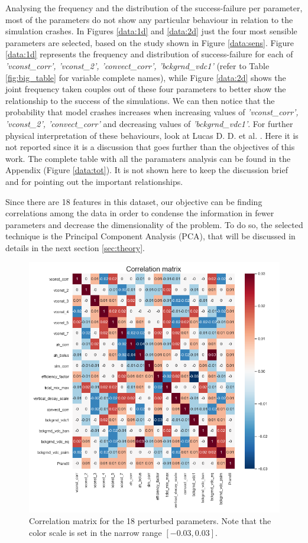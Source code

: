 \documentclass[english,notitlepage,reprint,nofootinbib]{revtex4-1}  %
\begin{document}
Analysing the frequency and the distribution of the success-failure per parameter, most of the parameters do not show any particular behaviour in relation to the simulation crashes. In Figures \ref{data:1d} and \ref{data:2d} just the four most sensible parameters are selected, based on the study \cite{failure} shown in Figure \ref{data:sens}. Figure \ref{data:1d} represents the frequency and distribution of success-failure for each of \textit{'vconst\_corr', 'vconst\_2', 'convect\_corr', 'bckgrnd\_vdc1'} (refer to Table \ref{fig:big_table} for variable complete names), while Figure \ref{data:2d} shows the joint frequency taken couples out of these four parameters to better show the relationship to the success of the simulations. We can then notice that the probability that model crashes increases when increasing values of \textit{'vconst\_corr', 'vconst\_2', 'convect\_corr'} and decreasing values of \textit{'bckgrnd\_vdc1'}. For further physical interpretation of these behaviours, look at Lucas D. D. et al. \cite{failure}. Here it is not reported since it is a discussion that goes further than the objectives of this work. The complete table with all the paramaters analysis can be found in the Appendix (Figure \ref{data:tot}). It is not shown here to keep the discussion brief and for pointing out the important relationships. 

Since there are 18 features in this dataset, our objective can be finding correlations among the data in order to condense the information in fewer parameters and decrease the dimensionality of the problem. To do so, the selected technique is the Principal Component Analysis (PCA), that will be discussed in details in the next section \ref{sec:theory}.

\begin{figure}[h]
    \centering 
    \includegraphics[scale=0.3]{dataset/correlationmatrix.png}
    \caption{Correlation matrix for the 18 perturbed parameters. Note that the color scale is set in the narrow range $[-0.03,0.03]$.}
    \label{data:corr}
\end{figure}
\end{document}
